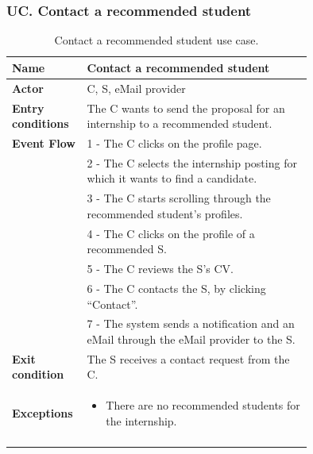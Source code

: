\subsubsection*{UC\cuc . Contact a recommended student}
\begin{center}
    \begin{longtable}{|l|p{0.75\linewidth}|}
        \hline
        \textbf{Name}               & Contact a recommended student\\
        \hline
        \textbf{Actor}              & C, S, eMail provider\\
        \hline
        \textbf{Entry conditions}   & The C wants to send the proposal for an internship to a recommended student.\\
        \hline
        \textbf{Event Flow}         & 1 - The C clicks on the profile page. \\
        & 2 - The C selects the internship posting for which it wants to find a candidate. \\
        & 3 - The C starts scrolling through the recommended student’s profiles. \\
        & 4 - The C clicks on the profile of a recommended S. \\
        & 5 - The C reviews the S’s CV. \\
        & 6 - The C contacts the S, by clicking “Contact”. \\
        & 7 - The system sends a notification and an eMail through the eMail provider to the S. \\
        \hline
        \textbf{Exit condition}   & The S receives a contact request from the C. \\       
        \hline
        \textbf{Exceptions}       & \begin{itemize}
            \item There are no recommended students for the internship.
        \end{itemize}\\
        \hline
        \caption{Contact a recommended student use case.}
        \label{tab: contact_recommended_student_use_case}
    \end{longtable}
\end{center}


